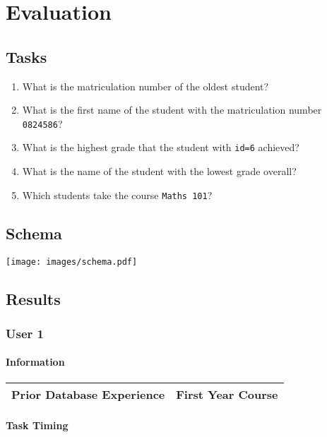 \chapter{Evaluation}

\section{Tasks}
\label{sec:tasks}

\begin{enumerate}
\item What is the matriculation number of the oldest student?
\item What is the first name of the student with the matriculation number \texttt{0824586}?
\item What is the highest grade that the student with \texttt{id=6} achieved?
\item What is the name of the student with the lowest grade overall?
\item Which students take the course \texttt{Maths 101}?
\end{enumerate}

\section{Schema}
\label{sec:schema}

\texttt{[image: images/schema.pdf]}

\section{Results}

\subsection{User 1}

\subsubsection{Information}

\begin{tabular}{|l|l|}
	\hline
	\textbf{Prior Database Experience} & First Year Course \\
	\hline
\end{tabular}

\subsubsection{Task Timing}

